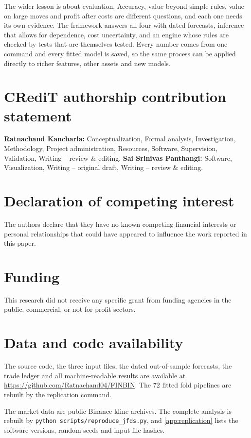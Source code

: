 \documentclass[preprint,12pt,authoryear,a4paper]{elsarticle}
\newif\ifblind
\begin{document}
The wider lesson is about evaluation. Accuracy, value beyond simple rules, value on
large moves and profit after costs are different questions, and each one needs its
own evidence. The framework answers all four with dated forecasts, inference that
allows for dependence, cost uncertainty, and an engine whose rules are checked by
tests that are themselves tested. Every number comes from one command and every
fitted model is saved, so the same process can be applied directly to richer
features, other assets and new models.

\ifblind
\else
\section*{CRediT authorship contribution statement}

\textbf{Ratnachand Kancharla:} Conceptualization, Formal analysis, Investigation,
Methodology, Project administration, Resources, Software, Supervision, Validation,
Writing -- review \& editing.
\textbf{Sai Srinivas Panthangi:} Software, Visualization, Writing -- original
draft, Writing -- review \& editing.

\section*{Declaration of competing interest}

The authors declare that they have no known competing financial interests or
personal relationships that could have appeared to influence the work reported in
this paper.

\section*{Funding}

This research did not receive any specific grant from funding agencies in the
public, commercial, or not-for-profit sectors.
\fi

\section*{Data and code availability}

\ifblind
The code, the three input files, the dated out-of-sample forecasts, the trade
ledger and all machine-readable results are kept in a public code repository. To
keep the review anonymous, its link is not shown in this copy. The link is given on
the separate title page, and it will be added to the paper after review.
\else
The source code, the three input files, the dated out-of-sample forecasts, the
trade ledger and all machine-readable results are available at
\url{https://github.com/Ratnachand04/FINBIN}. The 72 fitted fold pipelines are
rebuilt by the replication command.
\fi
The market data are public Binance kline archives. The complete analysis is rebuilt
by \texttt{python scripts/reproduce\_jfds.py}, and \ref{app:replication} lists the
software versions, random seeds and input-file hashes.
\end{document}

